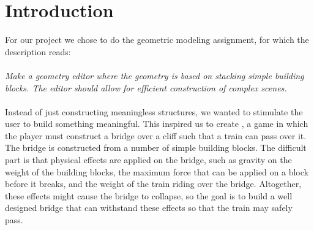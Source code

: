 \section{Introduction}
For our project we chose to do the geometric modeling assignment, for which the description reads:\\
\\
\textit{Make a geometry editor where the geometry is based on stacking simple building blocks. The editor should allow for efficient construction of complex scenes.}\\
\\
Instead of just constructing meaningless structures, we wanted to stimulate the user to build something meaningful. This inspired us to create \name, a game in which the player must construct a bridge over a cliff such that a train can pass over it. The bridge is constructed from a number of simple building blocks. The difficult part is that physical effects are applied on the bridge, such as gravity on the weight of the building blocks, the maximum force that can be applied on a block before it breaks, and the weight of the train riding over the bridge. Altogether, these effects might cause the bridge to collapse, so the goal is to build a well designed bridge that can withstand these effects so that the train may safely pass.